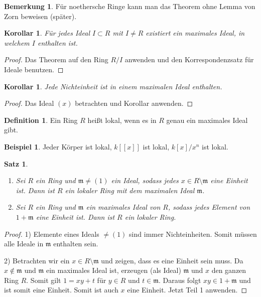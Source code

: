 \documentclass[reqno,12pt]{article}
\numberwithin{equation}{section}
\theoremstyle{plain}
\newtheorem{proposition}[thm]{Satz}
\newtheorem{cor}[thm]{Korollar}
\theoremstyle{definition}
\newtheorem{definition}[thm]{Definition}
\newtheorem{example}[thm]{Beispiel}
\newtheorem{remark}[thm]{Bemerkung}
\begin{document}
\newpage
\begin{remark}
Für noethersche Ringe kann man das Theorem ohne Lemma von Zorn beweisen (später).
\end{remark}

\begin{cor}\label{cor-ideal-contained-in-maximal}
  Für jedes Ideal $I \subset R$ mit $I \neq R$ existiert ein maximales Ideal, in welchem $I$ enthalten ist.
\end{cor}

\begin{proof}
  Das Theorem auf den Ring $R/I$ anwenden und den Korrespondenzsatz für Ideale benutzen.
\end{proof}

\begin{cor}
  Jede Nichteinheit ist in einem maximalen Ideal enthalten.
\end{cor}

\begin{proof}
  Das Ideal $(x)$ betrachten und Korollar anwenden.
\end{proof}

\begin{definition}
  Ein Ring $R$ heißt {\sf lokal}, wenn es in $R$ genau ein maximales Ideal gibt.
\end{definition}

\begin{example}
  Jeder Körper ist lokal, $k[[x]]$ ist lokal, $k[x]/x^n$ ist lokal.
\end{example}

\begin{proposition}
\
  \begin{enumerate}
    \item Sei $R$ ein Ring und $\mathfrak{m} \neq (1)$ ein Ideal, sodass jedes $x \in R \setminus \mathfrak{m}$ eine Einheit ist. Dann ist $R$ ein lokaler Ring mit dem maximalen Ideal $\mathfrak{m}$.

    \item Sei $R$ ein Ring und $\mathfrak{m}$ ein maximales Ideal von $R$, sodass jedes Element von $1+\mathfrak{m}$ eine Einheit ist. Dann ist $R$ ein lokaler Ring.
  \end{enumerate}
\end{proposition}

\begin{proof}
  1) Elemente eines Ideals $\neq (1)$ sind immer Nichteinheiten. Somit müssen alle Ideale in $\mathfrak{m}$ enthalten sein.

  2) Betrachten wir ein $x \in R \setminus \mathfrak{m}$ und zeigen, dass es eine Einheit sein muss. Da $x \notin \mathfrak{m}$ und $\mathfrak{m}$ ein maximales Ideal ist, erzeugen (als Ideal) $\mathfrak{m}$ und $x$ den ganzen Ring $R$. Somit gilt $1 = xy + t$ für $y \in R$ und $t \in \mathfrak{m}$. Daraus folgt $xy \in 1 + \mathfrak{m}$ und ist somit eine Einheit. Somit ist auch $x$ eine Einheit. Jetzt Teil 1 anwenden.
\end{proof}
\end{document}
